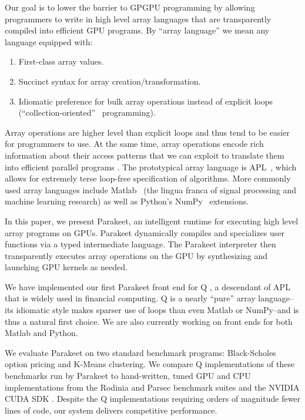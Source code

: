 \documentclass[preprint]{sigplanconf}
\begin{document}
Our goal is to lower the barrier to GPGPU programming by allowing programmers to
write in high level array languages that are transparently compiled into
efficient GPU programs. By ``array language'' we mean any language equipped
with:
\begin{enumerate}
\item First-class array values.
\item Succinct syntax for array creation/transformation.
\item Idiomatic preference for bulk array operations instead of explicit loops
(``collection-oriented''~\cite{Sip91} programming).
\end{enumerate}

Array operations are higher level than explicit loops and thus tend
to be easier for programmers to use. At the same time, array operations encode
rich information about their access patterns that we can exploit to translate
them into efficient parallel programs \cite{Ju94}. The prototypical array
language is APL~\cite{Iverson62}, which allows for extremely terse loop-free
specification of algorithms. More commonly used array languages include
Matlab~\cite{Moler80} (the lingua franca of signal processing and machine
learning research) as well as Python's NumPy~\cite{Oliphant07} extensions.

In this paper, we present Parakeet, an intelligent runtime for executing high
level array programs on GPUs. Parakeet dynamically compiles and specializes user
functions via a typed intermediate language.  The Parakeet interpreter then
transparently executes array operations on the GPU by synthesizing and launching
GPU kernels as needed.


We have implemented our first Parakeet front end for Q \cite{Borr08}, a
descendant of APL that is widely used in financial computing. 
Q is a nearly ``pure'' array language--its idiomatic style makes sparser use of
loops than even Matlab or NumPy--and is thus a natural first choice.
We are also currently working on front ends for both Matlab and Python.

We evaluate Parakeet on two standard benchmark programs: Black-Scholes option
pricing and K-Means clustering.  We compare Q implementations of these
benchmarks run by Parakeet to hand-written, tuned GPU and CPU implementations
from the Rodinia \cite{Che09} and Parsec \cite{Bien08} benchmark suites and the
NVIDIA CUDA SDK \cite{NvidSD}.  Despite the Q implementations requiring orders
of magnitude fewer lines of code, our system delivers competitive performance.
\end{document}
